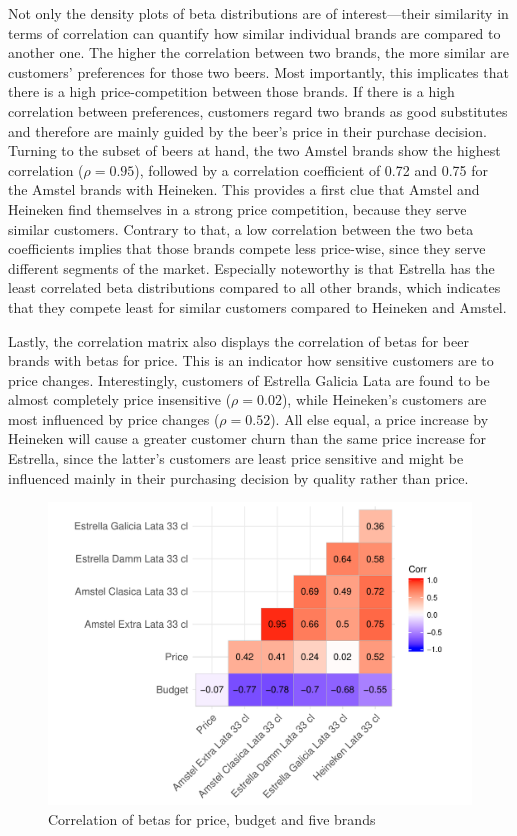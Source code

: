 \documentclass[12pt,a4paper]{article}
\begin{document}
Not only the density plots of beta distributions are of interest---their similarity in terms of correlation can quantify how similar individual brands are compared to another one.
The higher the correlation between two brands, the more similar are customers' preferences for those two beers.
Most importantly, this implicates that there is a high price-competition between those brands.
If there is a high correlation between preferences, customers regard two brands as good substitutes and therefore are mainly guided by the beer's price in their purchase decision.
Turning to the subset of beers at hand, the two Amstel brands show the highest correlation ($\rho=0.95$), followed by a correlation coefficient of 0.72 and 0.75 for the Amstel brands with Heineken.
This provides a first clue that Amstel and Heineken find themselves in a strong price competition, because they serve similar customers.
Contrary to that, a low correlation between the two beta coefficients implies that those brands compete less price-wise, since they serve different segments of the market.
Especially noteworthy is that Estrella has the least correlated beta distributions compared to all other brands, which indicates that they compete least for similar customers compared to Heineken and Amstel.

Lastly, the correlation matrix also displays the correlation of betas for beer brands with betas for price.
This is an indicator how sensitive customers are to price changes.
Interestingly, customers of Estrella Galicia Lata are found to be almost completely price insensitive ($\rho=0.02$), while Heineken's customers are most influenced by price changes ($\rho=0.52$).
All else equal, a price increase by Heineken will cause a greater customer churn than the same price increase for Estrella, since the latter's customers are least price sensitive and might be influenced mainly in their purchasing decision by quality rather than price.

\begin{figure}[ht]
	\centering
  \includegraphics[scale = 0.7]{figures/corrplot_betas_five.pdf}
	\caption{Correlation of betas for price, budget and five brands}
	\label{fig_corr_five}
\end{figure}
\end{document}
